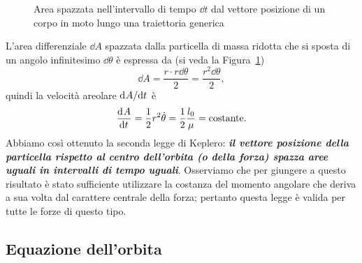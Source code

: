 \begin{figure}
  \centering
  \caption[Area spazzata nell'intervallo di tempo $\dd t$ dal vettore
  posizione]{Area spazzata nell'intervallo di tempo $\dd t$ dal vettore
    posizione di un corpo in moto lungo una traiettoria generica}
\label{fig:area-differenziale}
\end{figure}
L'area differenziale $\dd A$ spazzata dalla particella di massa ridotta che si
sposta di un angolo infinitesimo $\dd\theta$ è espressa da (si veda la
Figura~\ref{fig:area-differenziale})
\begin{equation}
  \dd A = \frac{r\cdot r\dd\theta}{2} = \frac{r^2\dd\theta}{2},
\end{equation}
quindi la velocità areolare $\mathrm{d}^{}A / \mathrm{d} {t}^{}$ è
\begin{equation}
  \label{eq:velocita-areolare}
  \frac{{\mathop{}\!\mathrm{d}^{}}A}{\mathop{}\!\mathrm{d} {t}^{}} = \frac{1}{2}r^2\dot{\theta} = \frac{1}{2}\frac{l_0}{\mu} =
  \text{costante}.
\end{equation}
Abbiamo così ottenuto la seconda legge di Keplero:
\textbf{\emph{il vettore posizione della particella rispetto al centro
    dell'orbita (o della forza) spazza aree uguali in intervalli di tempo
    uguali}}. Osserviamo che per giungere a questo risultato è stato sufficiente
utilizzare la costanza del momento angolare che deriva a sua volta dal carattere
centrale della forza; pertanto questa legge è valida per tutte le forze di
questo tipo.

\subsection{Equazione dell'orbita}
\label{sec:equazione-dellorbita}

